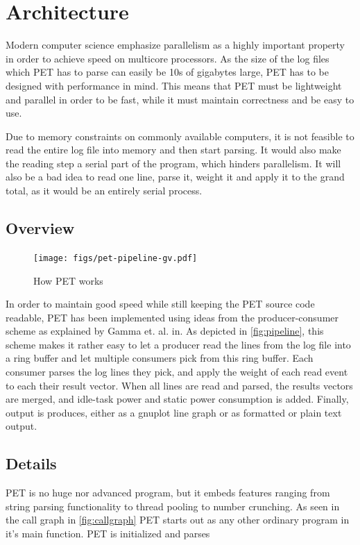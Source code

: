 \section{Architecture}

Modern computer science emphasize parallelism as a highly important property in
order to achieve speed on multicore processors. As the size of the log files
which PET has to parse can easily be 10s of gigabytes large, PET has to be
designed with performance in mind. This means that PET must be lightweight and parallel
in order to be fast, while it must maintain correctness and be easy to use.

Due to memory constraints on commonly available computers, it is not feasible to read the entire log
file into memory and then start parsing. It would also make the reading step a serial part of the program,
which hinders parallelism. It will also be a bad idea to read one line, parse
it, weight it and apply it to the grand total, as it would be an entirely serial process.

\subsection{Overview}

\begin{figure}[ht]
    \texttt{[image: figs/pet-pipeline-gv.pdf]}
    \caption{How PET works}
    \label{fig:pipeline}
\end{figure}

In order to maintain good speed while still keeping the PET source code
readable, PET has been implemented using ideas from the producer-consumer scheme
as explained by Gamma et.  al.  in\cite{designpatterns}. As depicted in
\autoref{fig:pipeline}, this scheme makes it rather easy to let a producer read
the lines from the log file into a ring buffer and let multiple consumers pick
from this ring buffer. Each consumer parses the log lines they pick, and apply
the weight of each read event to each their result vector. When all lines are
read and parsed, the results vectors are merged, and idle-task power and static
power consumption is added. Finally, output is produces, either as a gnuplot
line graph or as formatted or plain text output.

\subsection{Details}

PET is no huge nor advanced program, but it embeds features ranging from string
parsing functionality to thread pooling to number crunching. As seen in the call graph
in \autoref{fig:callgraph} PET starts out as any other ordinary program in it's main
function. PET is initialized and parses 


